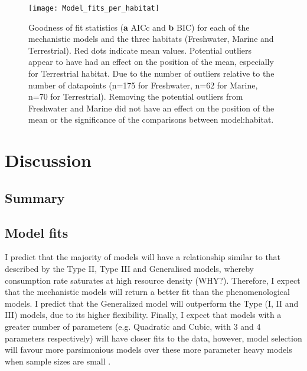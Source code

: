 \documentclass[11pt]{article}
\begin{document}
            \begin{figure}[htpb]
                \texttt{[image: Model\_fits\_per\_habitat]}\label{Habitat}
                \centering
                \caption{Goodness of fit statistics (\textbf{a} AICc and \textbf{b} BIC) for each of the mechanistic models and the three habitats (Freshwater, Marine and Terrestrial). Red dots indicate mean values. Potential outliers appear to have had an effect on the position of the mean, especially for Terrestrial habitat. Due to the number of outliers relative to the number of datapoints (n=175 for Freshwater, n=62 for Marine, n=70 for Terrestrial). Removing the potential outliers from Freshwater and Marine did not have an effect on the position of the mean or the significance of the comparisons between model:habitat.}
            \end{figure}

    \section{Discussion} %
            \subsection{Summary}
            \subsection{Model fits}
                
                I predict that the majority of models will have a relationship similar to that described by the Type II, Type III and Generalised models, whereby consumption rate saturates at high resource density (WHY?). Therefore, I expect that the mechanistic models will return a better fit than the phenomenological models. I predict that the Generalized model will outperform the Type (I, II and III) models, due to its higher flexibility. Finally, I expect that models with a greater number of parameters (e.g. Quadratic and Cubic, with 3 and 4 parameters respectively) will have closer fits to the data, however, model selection will favour more parsimonious models over these more parameter heavy models when sample sizes are small \citep{johnson2004model}.
            
\end{document}
